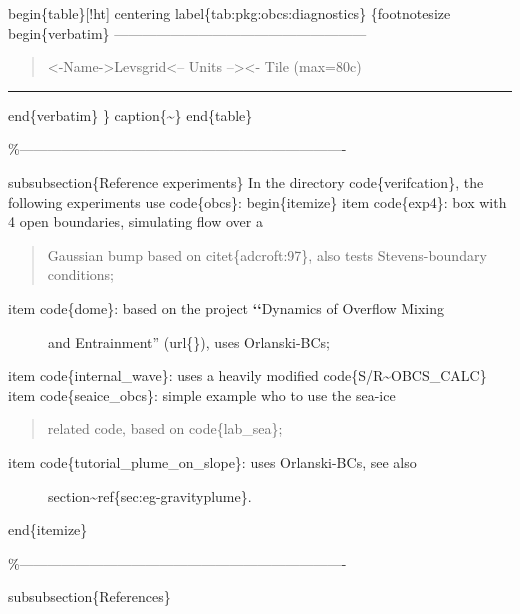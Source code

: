 \documentclass[letterpaper,10pt,english]{sphinxmanual}
\begin{document}
begin\{table\}{[}!ht{]}
centering
label\{tab:pkg:obcs:diagnostics\}
\{footnotesize
begin\{verbatim\}
------------------------------------------------------
\begin{quote}

\textless{}-Name-\textgreater{}\textbar{}Levs\textbar{}grid\textbar{}\textless{}--  Units   --\textgreater{}\textbar{}\textless{}- Tile (max=80c)
\end{quote}


\bigskip\hrule\bigskip


end\{verbatim\}
\}
caption\{\textasciitilde{}\}
end\{table\}

\%----------------------------------------------------------------------

subsubsection\{Reference experiments\}
In the directory code\{verifcation\}, the following experiments use
code\{obcs\}:
begin\{itemize\}
item code\{exp4\}: box with 4 open boundaries, simulating flow over a
\begin{quote}

Gaussian bump based on citet\{adcroft:97\}, also tests
Stevens-boundary conditions;
\end{quote}
\begin{description}
\item[{item code\{dome\}: based on the project {\color{red}\bfseries{}{}`{}`}Dynamics of Overflow Mixing}] \leavevmode
and Entrainment''
(url\{\}), uses
Orlanski-BCs;

\end{description}

item code\{internal\_wave\}: uses a heavily modified code\{S/R\textasciitilde{}OBCS\_CALC\}
item code\{seaice\_obcs\}: simple example who to use the sea-ice
\begin{quote}

related code, based on code\{lab\_sea\};
\end{quote}
\begin{description}
\item[{item code\{tutorial\_plume\_on\_slope\}: uses Orlanski-BCs, see also}] \leavevmode
section\textasciitilde{}ref\{sec:eg-gravityplume\}.

\end{description}

end\{itemize\}

\%----------------------------------------------------------------------

subsubsection\{References\}
\end{document}
